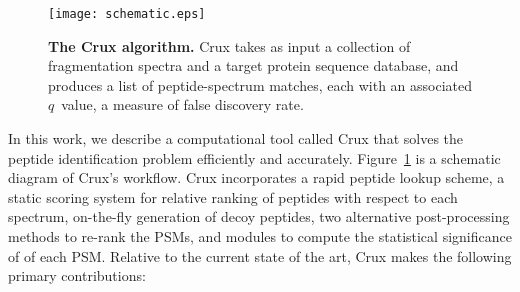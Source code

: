 \documentclass[12pt]{article}
\begin{document}
\begin{figure}
\centering
\texttt{[image: schematic.eps]}
\caption{{\bf The Crux algorithm.}  Crux takes as input a collection
  of fragmentation spectra and a target protein sequence database, and
  produces a list of peptide-spectrum matches, each with an associated
  $q$~value, a measure of false discovery rate. 
  \label{figure:crux}}
\end{figure}

In this work, we describe a computational tool called Crux that solves
the peptide identification problem efficiently and accurately.
Figure~\ref{figure:crux} is a schematic diagram of Crux's workflow.
Crux incorporates a rapid peptide lookup scheme, a static scoring
system for relative ranking of peptides with respect to each spectrum,
on-the-fly generation of decoy peptides, two alternative
post-processing methods to re-rank the PSMs, and modules to compute
the statistical significance of of each PSM.  Relative to the current
state of the art, Crux makes the following primary contributions:
\end{document}
